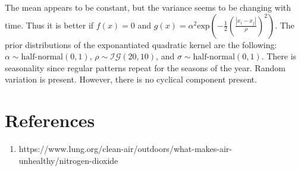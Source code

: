 \documentclass[a4paper, 10pt]{article}
\begin{document}
\begin{flushleft}
      The mean appears to be constant, but the variance seems to be changing with time. Thus it is better if $f(x) = 0$ and $g(x) = \alpha^{2} \text{exp}(- \frac{1}{2} (\frac{|x_i - x_j|}{\rho})^2)$. The prior distributions of the exponantiated quadratic kernel are the following: $\alpha \sim \text{half-normal}(0, 1)$, $\rho \sim \mathcal{IG}(20, 10)$, and $\sigma \sim \text{half-normal}(0, 1)$. There is seasonality since regular patterns repeat for the seasons of the year. Random variation is present. However, there is no cyclical component present.
   
   \section*{References}
      \begin{enumerate}
         \item https://www.lung.org/clean-air/outdoors/what-makes-air-unhealthy/nitrogen-dioxide
      \end{enumerate}
   
   \end{flushleft}
\end{document}
